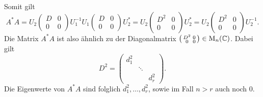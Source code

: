 Somit gilt
\[
    A^* A
  = U_2
    \begin{pmatrix}
      D & 0 \\
      0 & 0
    \end{pmatrix}
    U_1^{-1}
    U_1
    \begin{pmatrix}
      D & 0 \\
      0 & 0
    \end{pmatrix}
    U_2^*
  = U_2
    \begin{pmatrix}
      D^2 & 0 \\
      0   & 0
    \end{pmatrix}
    U_2^*
  = U_2
    \begin{pmatrix}
      D^2 & 0 \\
      0   & 0
    \end{pmatrix}
    U_2^{-1}.
\]
Die Matrix $A^* A$ ist also ähnlich zu der Diagonalmatrix $\begin{psmallmatrix} D^2 & 0 \\ 0 & 0 \end{psmallmatrix} \in \operatorname{M}_{n}(\mathbb{C})$.
Dabei gilt
\[
    D^2
  = \begin{pmatrix}
      d_1^2 &         &       \\
            & \ddots  &       \\
            &         & d_r^2
    \end{pmatrix}.
\]
Die Eigenwerte von $A^* A$ sind folglich $d_1^2, \dotsc, d_r^2$, sowie im Fall $n > r$ auch noch $0$.






